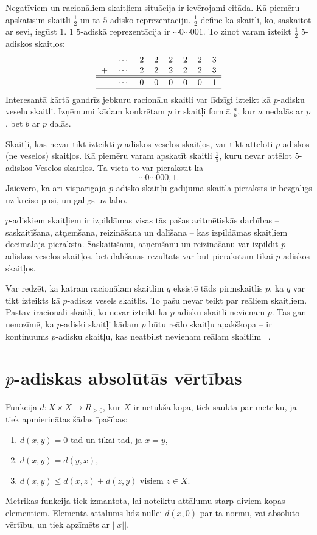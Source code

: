 \documentclass{ludis}
\begin{document}
Negatīviem un racionāliem skaitļiem situācija ir ievērojami citāda. Kā piemēru apskatīsim skaitli $\frac{1}{2}$ un tā $5$-adisko reprezentāciju. $\frac{1}{2}$ definē kā skaitli, ko, saskaitot ar sevi, iegūst $1$. $1$ $5$-adiskā reprezentācija ir $\cdots 0 \cdots 001$. To zinot varam izteikt $\frac{1}{2}$ $5$-adiskos skaitļos:
\[
\begin{tabular}{rrrrrrrrr|}
&$\cdots$ &2 &2 &2 &2 &2 &3\\
+&$\cdots$ &2 &2 &2 &2 &2 &3\\
\hline
\hline
&$\cdots$ &0 &0 &0 &0 &0 &1\\
\hline
\end{tabular}
\]
Interesantā kārtā gandrīz jebkuru racionālu skaitli var līdzīgi izteikt kā $p$-adisku veselu skaitli.
Izņēmumi kādam konkrētam $p$ ir skaitļi formā $\frac{a}{b}$, kur $a$ nedalās ar $p$, bet $b$ ar $p$ dalās.

Skaitļi, kas nevar tikt izteikti $p$-adiskos veselos skaitļos, var tikt attēloti $p$-adiskos (ne veselos) skaitļos. Kā piemēru varam apskatīt skaitli $\frac{1}{5}$, kuru nevar attēlot $5$-adiskos Veselos skaitļos. Tā vietā to var pierakstīt kā
\[
\cdots 0 \cdots 000,1.
\]
Jāievēro, ka arī vispārīgajā $p$-adisko skaitļu gadījumā skaitļa pieraksts ir bezgalīgs uz kreiso pusi, un galīgs uz labo.

$p$-adiskiem skaitļiem ir izpildāmas visas tās pašas aritmētiskās darbības -- saskaitīšana, atņemšana, reizināšana un dalīšana -- kas izpildāmas skaitļiem decimālajā pierakstā. Saskaitīšanu, atņemšanu un reizināšanu var izpildīt $p$-adiskos veselos skaitļos, bet dalīšanas rezultāts var būt pierakstām tikai $p$-adiskos skaitļos.

Var redzēt, ka katram racionālam skaitlim $q$ eksistē tāds pirmskaitlis $p$, ka $q$ var tikt izteikts kā $p$-adisks vesels skaitlis. To pašu nevar teikt par reāliem skaitļiem. Pastāv iracionāli skaitļi, ko nevar izteikt kā $p$-adisku skaitli nevienam $p$. Tas gan nenozīmē, ka $p$-adiski skaitļi kādam $p$ būtu reālo skaitļu apakškopa -- ir kontinuums $p$-adisku skaitļu, kas neatbilst nevienam reālam skaitlim ~\citep{Freivalds2012}.

\section{$p$-adiskas absolūtās vērtības}
Funkcija $d: X \times X \rightarrow R_{\geq 0}$, kur $X$ ir netukša kopa, tiek saukta par metriku, ja tiek apmierinātas šādas īpašības:
\begin{enumerate}
\item $d(x,y) = 0$ tad un tikai tad, ja $x = y$,
\item $d(x,y) = d(y,x)$,
\item $d(x,y) \leq d(x,z) + d(z,y)$ visiem $z \in X$.
\end{enumerate}
Metrikas funkcija tiek izmantota, lai noteiktu attālumu starp diviem kopas elementiem. Elementa attālums līdz nullei $d(x,0)$ par tā normu, vai absolūto vērtību, un tiek apzīmēts ar $||x||$.
\end{document}

